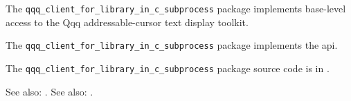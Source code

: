 
The {\tt qqq\_client\_for\_library\_in\_c\_subprocess} package implements base-level access to the Qqq addressable-cursor
text display toolkit.

The {\tt qqq\_client\_for\_library\_in\_c\_subprocess} package implements the  api.

The {\tt qqq\_client\_for\_library\_in\_c\_subprocess} package source code is in .

See also:  .
See also:  .


